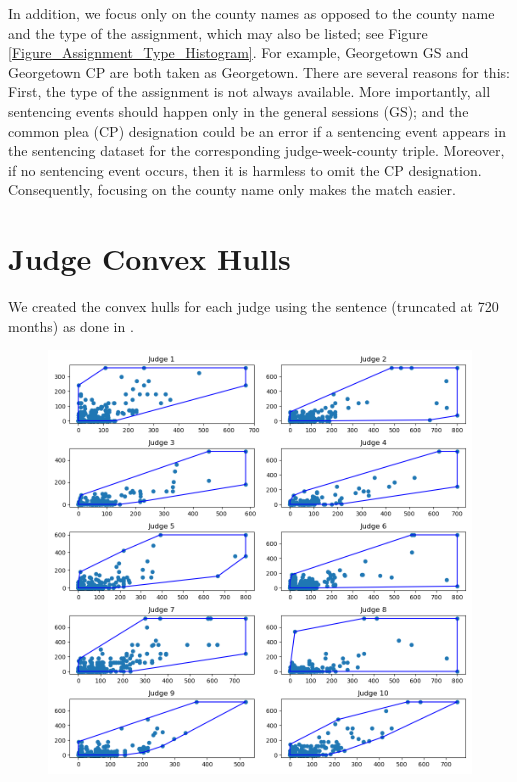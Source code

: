 \documentclass[11pt, oneside]{article}   	%
\theoremstyle{ModifiedStyle}
\begin{document}
  	In addition, we focus only on the county names as opposed to the county name and the type of the assignment, which may also be listed; see Figure \ref{Figure_Assignment_Type_Histogram}. For example, Georgetown GS and Georgetown CP are both taken as Georgetown. There are several reasons for this: First, the type of the assignment is not always available. More importantly, all sentencing events should happen only in the general sessions (GS); and the common plea (CP) designation could be an error if a sentencing event appears in the sentencing dataset for the corresponding judge-week-county triple. Moreover, if no sentencing event occurs, then it is harmless to omit the CP designation. Consequently, focusing on the county name only makes the match easier.


\section{Judge Convex Hulls}
	\label{app-judge-convex-hulls}
	We created the convex hulls for each judge using the sentence (truncated at 720 months) as done in \cite{hester2017conditional}.
	\begin{figure}[H]
		\centering
		\includegraphics[width=\textwidth]{../../output/figures/Exploration/judge_convex_hulls_0.png}
	\end{figure}
\end{document}
